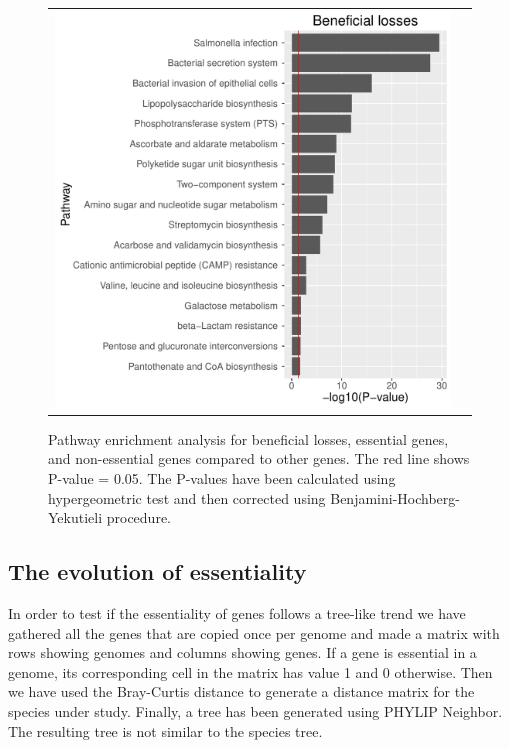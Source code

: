 \documentclass[12pt,letterpaper]{article}
\begin{document}
\begin{figure}
\begin{tabular}{c c}
\includegraphics[scale=0.4]{beneficialloss-pathways.pdf}&
\end{tabular}
\caption{Pathway enrichment analysis for beneficial losses, essential genes, and non-essential genes compared to other genes. The red line shows P-value = 0.05. The P-values have been calculated using hypergeometric test and then corrected using Benjamini-Hochberg-Yekutieli procedure.}
\label{fig:essentiality-pathway}
\end{figure}

\subsection{The evolution of essentiality}
In order to test if the essentiality of genes follows a tree-like trend we have gathered all the genes that are copied once per genome and made a matrix with rows showing genomes and columns showing genes. If a gene is essential in a genome, its corresponding cell in the matrix has value 1 and 0 otherwise. Then we have used the Bray-Curtis distance to generate a distance matrix for the species under study. Finally, a tree has been generated using PHYLIP Neighbor. The resulting tree is not similar to the species tree.
\end{document}
